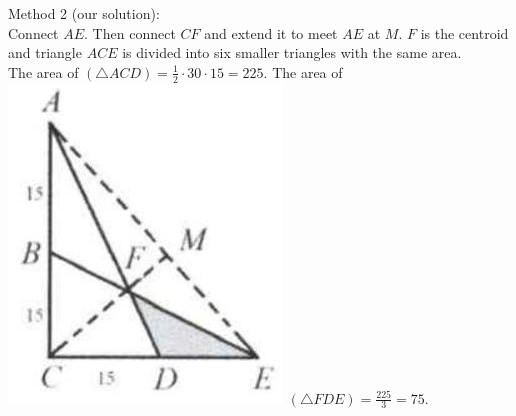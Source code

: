 \documentclass{article}
\begin{document}
Method 2 (our solution):\\
Connect \(A E\). Then connect \(C F\) and extend it to meet \(A E\) at \(M\). \(F\) is the centroid and triangle \(A C E\) is divided into six smaller triangles with the same area.\\
The area of \((\triangle A C D)=\frac{1}{2} \cdot 30 \cdot 15=225\). The area of\\
\includegraphics[width=\textwidth]{images/reasoning_image_1.jpg} \((\triangle F D E)=\frac{225}{3}=75\).
\end{document}
